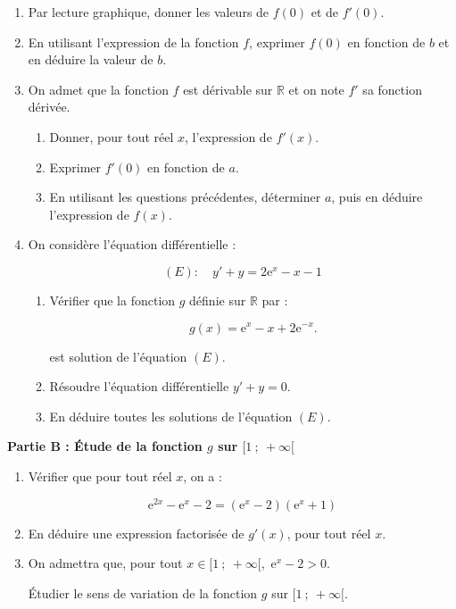 \documentclass[11pt,a4paper]{article}
\newcommand{\R}{\mathbb{R}}
\newcommand{\e}{\text{e}}
\begin{document}
\begin{enumerate}
\item Par lecture graphique, donner les valeurs de $f(0)$ et de $f'(0)$.
\item En utilisant l'expression de la fonction $f$, exprimer $f(0)$ en fonction de $b$ et en déduire la valeur de $b$.
\item On admet que la fonction $f$ est dérivable sur $\R$ et on note $f'$ sa fonction dérivée.
	\begin{enumerate}
		\item Donner, pour tout réel $x$, l'expression de $f'(x)$.
		\item Exprimer $f'(0)$ en fonction de $a$.
		\item En utilisant les questions précédentes, déterminer $a$, puis en déduire l'expression de $f(x)$.
	\end{enumerate}
\item On considère l'équation différentielle :

\[(E):\quad  y' +y =2\e^x - x - 1\]

	\begin{enumerate}
		\item Vérifier que la fonction $g$ définie sur $\R$ par :
		
\[g(x) = \e^x - x + 2\e^{-x}.\]

est solution de l'équation $(E)$.
		\item Résoudre l'équation différentielle $y' + y = 0$.
		\item En déduire toutes les solutions de l'équation $(E)$.
	\end{enumerate}
\end{enumerate}

\bigskip

\textbf{Partie B : Étude de la fonction $g$ sur $[1~;~+\infty[$}

\medskip

\begin{enumerate}
\item Vérifier que pour tout réel $x$, on a :

\[\e^{2x} - \e^x - 2 = \left(\e^x - 2\right)\left(\e^x + 1\right)\]

\item En déduire une expression factorisée de $g'(x)$, pour tout réel $x$.
\item On admettra que, pour tout $x \in  [1~;~ +\infty[$,\, $\e^x - 2 > 0$.

 Étudier le sens de variation de la fonction $g$ sur $[1~;~ +\infty[$.
\end{enumerate}
\end{document}
